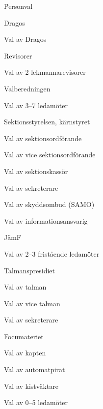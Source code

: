 \documentclass[slutlig]{sektionsmote}
\begin{document}
\begin{ootd}
\item{Personval}
\begin{ootd}
    \item Dragos
    \begin{ootd}
        \item Val av Dragos
    \end{ootd}
    \item Revisorer
    \begin{ootd}
        \item Val av 2 lekmannarevisorer
    \end{ootd}
    \item Valberedningen
    \begin{ootd}
        \item Val av 3--7 ledamöter
    \end{ootd}
    \item Sektionsstyrelsen, kärnstyret
    \begin{ootd}
        \item Val av sektionsordförande
        \item Val av vice sektionsordförande
        \item Val av sektionskassör
        \item Val av sekreterare
        \item Val av skyddsombud (SAMO)
        \item Val av informationsansvarig
    \end{ootd}
    \item JämF
    \begin{ootd}
        \item Val av 2--3 fristående ledamöter
    \end{ootd}
    \item Talmanspresidiet
    \begin{ootd}
        \item Val av talman
        \item Val av vice talman
        \item Val av sekreterare
    \end{ootd}
    \item Focumateriet
    \begin{ootd}
        \item Val av kapten
        \item Val av automatpirat
        \item Val av kistväktare
        \item Val av 0--5 ledamöter
    \end{ootd}

\end{ootd}
\end{ootd}
\end{document}
